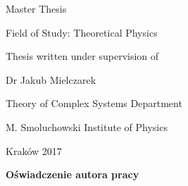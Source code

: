 \documentclass[a4paper,12pt]{article}
\begin{document}
\vspace{0.5cm}

\begin{center}
\begin{Large}Master Thesis\end{Large}

\vspace{0.1cm}

\begin{Large}Field of Study: Theoretical Physics\end{Large}
\end{center}

\vspace{1.2cm}

\begin{center}

\begin{large} \hfill Thesis written under supervision of

\vspace{0.1cm}

\hfill Dr Jakub Mielczarek

\vspace{0.1cm}

\hfill Theory of Complex Systems Department

\vspace{0.1cm}

\hfill M. Smoluchowski Institute of Physics
\end{large}

\end{center}

\vspace{1cm}

\begin{center}
\begin{Large}Kraków 2017\end{Large}
\end{center}


\pagebreak




\newpage\thispagestyle{empty}
\mbox{}
\newpage





\pagestyle{empty}

\begin{flushleft}
\begin{Large}\textbf{Oświadczenie autora pracy}\end{Large}
\end{flushleft}
\end{document}
